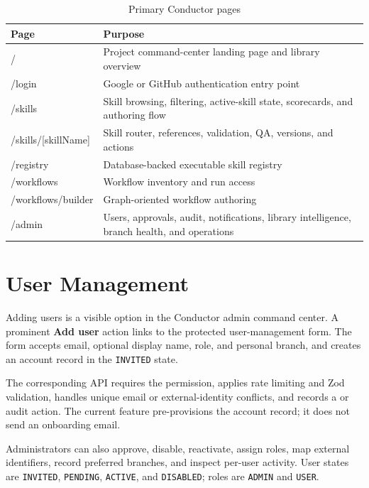 \documentclass[12pt]{report}
\begin{document}
\begin{table}[hbt!]
\centering
\small
\begin{tabularx}{\textwidth}{>{\ttfamily}p{}X}
\toprule
Page & Purpose \\
\midrule
/ & Project command-center landing page and library overview \\
/login & Google or GitHub authentication entry point \\
/skills & Skill browsing, filtering, active-skill state, scorecards, and authoring flow \\
/skills/[skillName] & Skill router, references, validation, QA, versions, and actions \\
/registry & Database-backed executable skill registry \\
/workflows & Workflow inventory and run access \\
/workflows/builder & Graph-oriented workflow authoring \\
/admin & Users, approvals, audit, notifications, library intelligence, branch health, and operations \\
\bottomrule
\end{tabularx}
\caption{Primary Conductor pages}
\label{tab:pages}
\end{table}

\section{User Management}

Adding users is a visible option in the Conductor admin command center. A prominent \textbf{Add user} action links to the protected user-management form. The form accepts email, optional display name, role, and personal branch, and creates an account record in the \texttt{INVITED} state.

The corresponding API requires the  permission, applies rate limiting and Zod validation, handles unique email or external-identity conflicts, and records a  or  audit action. The current feature pre-provisions the account record; it does not send an onboarding email.

Administrators can also approve, disable, reactivate, assign roles, map external identifiers, record preferred branches, and inspect per-user activity. User states are \texttt{INVITED}, \texttt{PENDING}, \texttt{ACTIVE}, and \texttt{DISABLED}; roles are \texttt{ADMIN} and \texttt{USER}.
\end{document}
